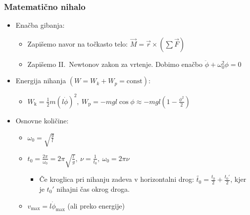 \subsubsection*{Matematično nihalo}
\begin{itemize}
    \item Enačba gibanja:
    \begin{itemize}
        \item Zapišemo navor na točkasto telo: \(\vec{M} = \vec{r} \times (\sum \vec{F})\)
        \item Zapišemo II.\ Newtonov zakon za vrtenje. Dobimo enačbo \(\ddot{\phi} + \omega_0^2 \phi = 0\)
    \end{itemize}
    \item Energija nihanja \((W = W_k + W_p = \text{const})\):
    \begin{itemize}
        \item \(W_\text{k} = \frac{1}{2} m (l \dot{\phi})^2, \ W_\text{p} = -mgl \cos \phi \approx -mgl (1 - \frac{\phi^2}{2})\)
    \end{itemize}
    \item Osnovne količine:
    \begin{itemize}
        \item \(\omega_0 = \sqrt{\frac{g}{l}}\)
        \item \(t_0 = \frac{2 \pi}{\omega_0} = 2 \pi \sqrt{\frac{l}{g}}, \ \nu = \frac{1}{t_0}, \ \omega_0 = 2 \pi \nu\)
        \begin{itemize}
            \item Če kroglica pri nihanju zadeva v horizontalni drog: \(\widetilde{t_0} = \frac{t_0}{2} + \frac{t_0'}{2}\), kjer je \(t_0'\) nihajni čas okrog droga.
        \end{itemize}
        \item \(v_\text{max} = l \dot{\phi}_\text{max}\) (ali preko energije)
    \end{itemize}
\end{itemize}

